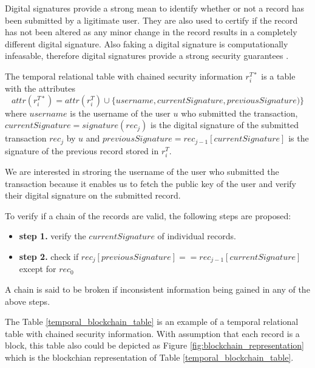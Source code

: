 			Digital signatures provide a strong mean to identify whether or not a record has been submitted by a ligitimate user. They are also used to certify if the record has not been altered as any minor change in the record results in a completely different digital signature. Also faking a digital signature is computationally infeasable, therefore digital signatures provide a strong security guarantees \cite{katz2010digital}.

			\begin{defn}
				The temporal relational table with chained security information $r_i^{T*}$ is a table with the attributes $$attr(r_i^{T*}) = attr(r_i^T) \cup \{username,currentSignature, previousSignature)\}$$ where $username$ is the username of the user $u$ who submitted the transaction, $currentSignature = signature(rec_j)$ is the digital signature of the submitted transaction $rec_j$ by $u$ and $previousSignature = rec_{j-1}[currentSignature]$ is the signature of the previous record stored in $r_i^T$. 
			\label{defn:temporal_blockchain}
			\end{defn}

			We are interested in stroring the username of the user who submitted the transaction because it enables us to fetch the public key of the user and verify their digital signature on the submitted record. 

			\begin{defn}
				To verify if a chain of the records are valid, the following steps are proposed:
				\begin{itemize}
					\item \textbf{step 1.} verify the $currentSignature$ of individual records.
					\item \textbf{step 2.} check if $rec_j[previousSignature] == rec_{j-1}[currentSignature]$ except for $rec_0$
				\end{itemize}
			\label{chain_verification}
			\end{defn}
			A chain is said to be broken if inconsistent information being gained in any of the above steps.

			\begin{example} 
				The Table \ref{temporal_blockchain_table} is an example of a temporal relational table with chained security information. With assumption that each record is a block, this table also could be depicted as Figure \ref{fig:blockchain_representation} which is the blockchian representation of Table \ref{temporal_blockchain_table}.
			\label{example:blockchain}
			\end{example}

